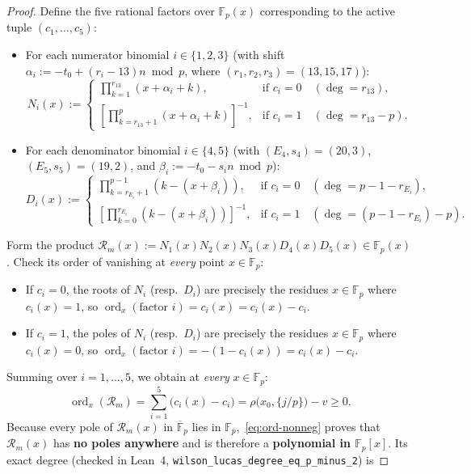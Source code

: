 \documentclass[11pt,reqno]{amsart}
\theoremstyle{definition}
\theoremstyle{remark}
\newcommand{\FF}{\mathbb{F}}
\newcommand{\ord}{\operatorname{ord}}
\begin{document}
\begin{proof}
Define the five rational factors over $\FF_p(x)$ corresponding to the active tuple $(c_1,\ldots,c_5)$:
\begin{itemize}
  \item For each numerator binomial $i \in \{1, 2, 3\}$ (with shift $\alpha_i := -t_0 + (r_i - 13)n \bmod p$, where $(r_1, r_2, r_3) = (13, 15, 17)$):
  \[
    N_i(x) := \begin{cases}
      \displaystyle \prod_{k=1}^{r_{13}} (x + \alpha_i + k), & \text{if } c_i = 0 \quad (\deg = r_{13}), \\[8pt]
      \displaystyle \left[\prod_{k=r_{13}+1}^{p} (x + \alpha_i + k)\right]^{-1}, & \text{if } c_i = 1 \quad (\deg = r_{13} - p).
    \end{cases}
  \]
  \item For each denominator binomial $i \in \{4, 5\}$ (with $(E_4, s_4) = (20, 3)$, $(E_5, s_5) = (19, 2)$, and $\beta_i := -t_0 - s_i n \bmod p$):
  \[
    D_i(x) := \begin{cases}
      \displaystyle \prod_{k=r_{E_i}+1}^{p-1} (k - (x + \beta_i)), & \text{if } c_i = 0 \quad (\deg = p - 1 - r_{E_i}), \\[8pt]
      \displaystyle \left[\prod_{k=0}^{r_{E_i}} (k - (x + \beta_i))\right]^{-1}, & \text{if } c_i = 1 \quad (\deg = (p - 1 - r_{E_i}) - p).
    \end{cases}
  \]
\end{itemize}
Form the product $\mathcal{R}_m(x) := N_1(x) N_2(x) N_3(x) D_4(x) D_5(x) \in \FF_p(x)$. Check its order of vanishing at \emph{every} point $x \in \FF_p$:
\begin{itemize}
  \item If $c_i = 0$, the roots of $N_i$ (resp.\ $D_i$) are precisely the residues $x \in \FF_p$ where $c_i(x) = 1$, so $\ord_x(\text{factor } i) = c_i(x) = c_i(x) - c_i$.
  \item If $c_i = 1$, the poles of $N_i$ (resp.\ $D_i$) are precisely the residues $x \in \FF_p$ where $c_i(x) = 0$, so $\ord_x(\text{factor } i) = -(1 - c_i(x)) = c_i(x) - c_i$.
\end{itemize}
Summing over $i = 1, \ldots, 5$, we obtain at \emph{every} $x \in \FF_p$:
\begin{equation}
\label{eq:ord-nonneg}
  \ord_x(\mathcal{R}_m) = \sum_{i=1}^{5} \bigl(c_i(x) - c_i\bigr) = \rho\bigl(x_0, \{j/p\}\bigr) - v \ge 0.
\end{equation}
Because every pole of $\mathcal{R}_m(x)$ in $\overline{\FF}_p$ lies in $\FF_p$,~\eqref{eq:ord-nonneg} proves that $\mathcal{R}_m(x)$ has \textbf{no poles anywhere} and is therefore a \textbf{polynomial in $\FF_p[x]$}. Its exact degree (checked in Lean~4, \texttt{wilson\_\allowbreak lucas\_\allowbreak degree\_\allowbreak eq\_\allowbreak p\_\allowbreak minus\_2}) is

\end{proof}
\end{document}
